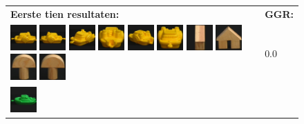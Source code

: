 \begin{figure}[!bp]
\vspace{5pt}
\centering
\begin{tabular}{m{11cm} | m{3cm} |}
\textbf{Eerste tien resultaten:} & \textbf{GGR:} \\
\vspace{4pt}
\includegraphics[width=1cm]{coil/beeld-12.eps}
\includegraphics[width=1cm]{coil/beeld-13.eps}
\includegraphics[width=1cm]{coil/beeld-15.eps}
\includegraphics[width=1cm]{coil/beeld-17.eps}
\includegraphics[width=1cm]{coil/beeld-16.eps}
\includegraphics[width=1cm]{coil/beeld-14.eps}
\includegraphics[width=1cm]{coil/beeld-47.eps}
\includegraphics[width=1cm]{coil/beeld-42.eps}
\includegraphics[width=1cm]{coil/beeld-0.eps}
\includegraphics[width=1cm]{coil/beeld-1.eps}
& {\scriptsize 0.0}
\\
\includegraphics[width=1cm]{coil/beeld-54.eps}

\end{tabular}
\end{figure}
